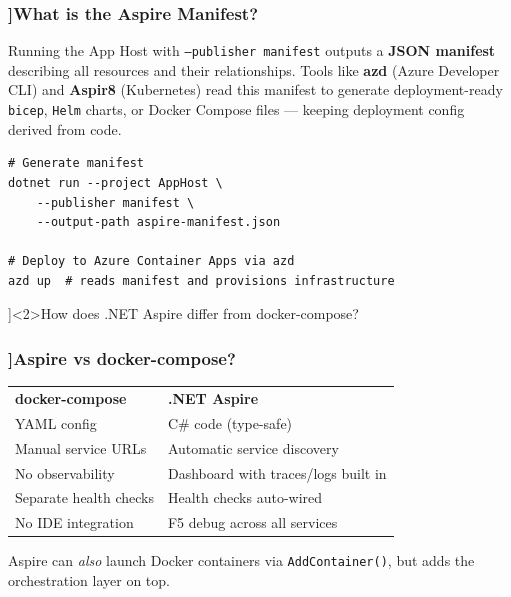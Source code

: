 \begin{frame}[fragile]
  \frametitle{\AnswerTitle[\CategoryBadge[AspireColor!20]{.NET Aspire}]{What is the Aspire Manifest?}}

  {\footnotesize
  Running the App Host with \texttt{--publisher manifest} outputs a \textbf{JSON manifest} describing all resources and their relationships. Tools like \textbf{azd} (Azure Developer CLI) and \textbf{Aspir8} (Kubernetes) read this manifest to generate deployment-ready \texttt{bicep}, \texttt{Helm} charts, or Docker Compose files — keeping deployment config derived from code.
  }

  \begin{verbatim}
# Generate manifest
dotnet run --project AppHost \
    --publisher manifest \
    --output-path aspire-manifest.json

# Deploy to Azure Container Apps via azd
azd up  # reads manifest and provisions infrastructure
  \end{verbatim}
\end{frame}

\QuestionSlide[\CategoryBadge[AspireColor!20]{.NET Aspire}]<2>{How does .NET Aspire differ from docker-compose?}

\begin{frame}[fragile]
  \frametitle{\AnswerTitle[\CategoryBadge[AspireColor!20]{.NET Aspire}]{Aspire vs docker-compose?}}

  {\footnotesize
  \begin{tabular}{ll}
    \textbf{docker-compose} & \textbf{.NET Aspire} \\
    YAML config & C\# code (type-safe) \\
    Manual service URLs & Automatic service discovery \\
    No observability & Dashboard with traces/logs built in \\
    Separate health checks & Health checks auto-wired \\
    No IDE integration & F5 debug across all services \\
  \end{tabular}
  \vspace{0.5em}
  Aspire can \emph{also} launch Docker containers via \texttt{AddContainer()}, but adds the orchestration layer on top.
  }
\end{frame}
